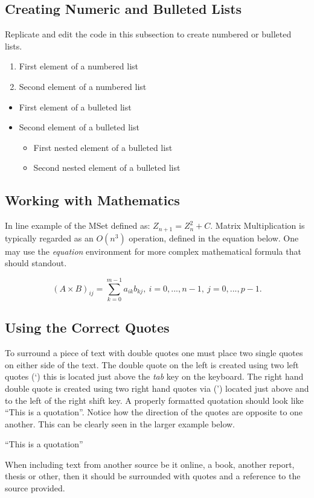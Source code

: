 \subsection{Creating Numeric and Bulleted Lists}
Replicate and edit the code in this subsection to create numbered or bulleted lists. 

{%
\begin{enumerate}
\item First element of a numbered list
\item Second element of a numbered list
\end{enumerate}
\begin{itemize}
\item First element of a bulleted list
\item Second element of a bulleted list
    \begin{itemize}
    \item First nested element of a bulleted list
    \item Second nested element of a bulleted list
    \end{itemize}
\end{itemize}
} %

\subsection{Working with Mathematics}\label{sec:WorkWithMath}
In line example of the MSet defined as: $Z_{n+1} =
Z_{n}^2 + C$. Matrix Multiplication is typically regarded as an $O(n^3)$
operation, defined in the equation below. One may use the \emph{equation} environment for more complex mathematical formula that should standout. 

\begin{equation}
(A \times B)_{ij} = \sum_{k=0} ^{m-1} a_{ik}b_{kj},~
i=0,...,n-1,~j=0,...,p-1.
\end{equation}

\clearpage

\subsection{Using the Correct Quotes}
To surround a piece of text with double quotes one must place two single quotes on either side of the text. The double quote on the left is created using two left quotes (\lq) this is located just above the \emph{tab} key on the keyboard. The right hand double quote is created using two right hand quotes via (\rq) located just above and to the left of the right shift key. A properly formatted quotation should look like ``This is a quotation''. Notice how the direction of the quotes are opposite to one another. This can be clearly seen in the larger example below. 
\begin{center}
\Huge{``This is a quotation''}
\end{center}
When including text from another source be it online, a book, another report, thesis or other, then it should be surrounded with quotes and a reference to the source provided. 

